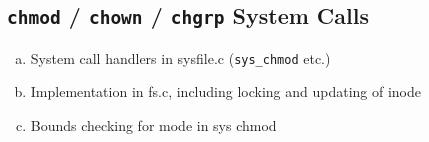 \documentclass[11pt,letterpaper]{report}
\begin{document}
                                                                                                                                                                                                                                                                                                                                                                                                                        \subsection*{{\tt chmod} / {\tt chown} / {\tt chgrp} System Calls}
                                                                                                                                                                                                                                                                                                                                                                                                                          \begin{enumerate}[(a)]
                                                                                                                                                                                                                                                                                                                                                                                                                                \item System call handlers in sysfile.c ({\tt sys\_chmod} etc.)
                                                                                                                                                                                                                                                                                                                                                                                                                                      \item Implementation in fs.c, including locking and updating of inode
                                                                                                                                                                                                                                                                                                                                                                                                                                            \item Bounds checking for mode in sys chmod

\end{enumerate}
\end{document}
